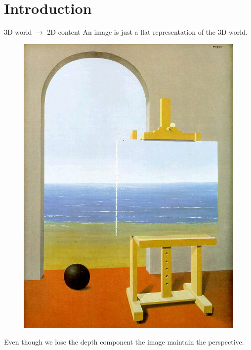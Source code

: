 \section{Introduction}

\begin{frame}{\secname}{3D world $\rightarrow$ 2D content}
    An image is just a flat representation of the 3D world.
    \begin{figure}
        \centering
        \includegraphics[height=0.5\textheight]{img/Magritte-human-condition.jpg}
    \end{figure}
    Even though we lose the depth component the image maintain the perspective.
\end{frame}


